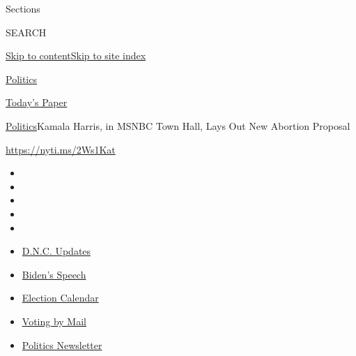Sections

SEARCH

\protect\hyperlink{site-content}{Skip to
content}\protect\hyperlink{site-index}{Skip to site index}

\href{https://www.nytimes3xbfgragh.onion/section/politics}{Politics}

\href{https://myaccount.nytimes3xbfgragh.onion/auth/login?response_type=cookie\&client_id=vi}{}

\href{https://www.nytimes3xbfgragh.onion/section/todayspaper}{Today's
Paper}

\href{/section/politics}{Politics}\textbar{}Kamala Harris, in MSNBC Town
Hall, Lays Out New Abortion Proposal

\url{https://nyti.ms/2Ws1Kat}

\begin{itemize}
\item
\item
\item
\item
\item
\end{itemize}

\begin{itemize}
\item
  \href{https://www.nytimes3xbfgragh.onion/live/2020/08/20/us/dnc-convention-election?action=click\&pgtype=Article\&state=default\&region=TOP_BANNER\&context=storylines_menu}{D.N.C.
  Updates}
\item
  \href{https://www.nytimes3xbfgragh.onion/2020/08/20/us/politics/biden-presidential-nomination-dnc.html?action=click\&pgtype=Article\&state=default\&region=TOP_BANNER\&context=storylines_menu}{Biden's
  Speech}
\item
  \href{https://www.nytimes3xbfgragh.onion/interactive/2019/us/elections/2020-presidential-election-calendar.html?action=click\&pgtype=Article\&state=default\&region=TOP_BANNER\&context=storylines_menu}{Election
  Calendar}
\item
  \href{https://www.nytimes3xbfgragh.onion/interactive/2020/08/11/us/politics/vote-by-mail-us-states.html?action=click\&pgtype=Article\&state=default\&region=TOP_BANNER\&context=storylines_menu}{Voting
  by Mail}
\item
  \href{https://www.nytimes3xbfgragh.onion/newsletters/politics?action=click\&pgtype=Article\&state=default\&region=TOP_BANNER\&context=storylines_menu}{Politics
  Newsletter}
\end{itemize}

